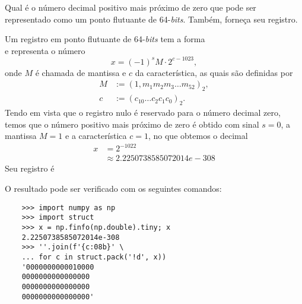 \begin{exeresol}
  Qual é o número decimal positivo mais próximo de zero que pode ser representado como um ponto flutuante de 64-{\it bits}. Também, forneça seu registro.
\end{exeresol}
\begin{resol}
  Um registro em ponto flutuante de 64-{\it bits} tem a forma
  \begin{equation}
    [s ~ | ~ c_{10} ~ c_9 ~ \ldots ~ c_{0} ~ | ~ m_1 ~ m_2 ~ \ldots ~ m_{52}]
  \end{equation}
  e representa o número
  \begin{equation}
    x = (-1)^s M\cdot 2^{c - 1023},
  \end{equation}
  onde $M$ é chamada de mantissa e $c$ da característica, as quais são definidas por
  \begin{align}
    M &:= (1,m_1m_2m_3\ldots m_{52})_2,\\
    c &:= (c_{10}\ldots c_2c_1c_0)_2.
  \end{align}
  Tendo em vista que o registro nulo é reservado para o número decimal zero, temos que o número positivo mais próximo de zero é obtido com sinal $s=0$, a mantissa $M=1$ e a característica $c=1$, no que obtemos o decimal
  \begin{align}
    x &= 2^{-1022}\\
      &\approx 2.2250738585072014e-308
  \end{align}
  Seu registro é
  \begin{equation}
    [0 ~ | ~ 0 ~ 0 ~ \ldots ~ 1 ~ | ~ 0 ~ 0 ~ \ldots ~ 0]
  \end{equation}

  O resultado pode ser verificado com os seguintes comandos:
  \begin{lstlisting}
    >>> import numpy as np
    >>> import struct
    >>> x = np.finfo(np.double).tiny; x
    2.2250738585072014e-308
    >>> ''.join(f'{c:08b}' \
    ... for c in struct.pack('!d', x))
    '0000000000010000
    0000000000000000
    0000000000000000
    0000000000000000'
  \end{lstlisting}
\end{resol}

